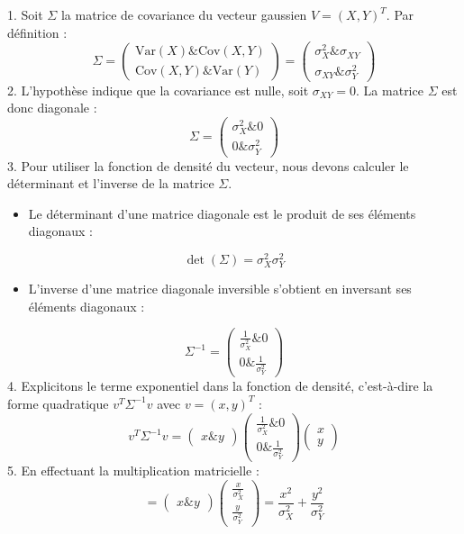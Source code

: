 \documentclass[11pt,a4paper]{article}
\begin{document}
1. Soit $\Sigma$ la matrice de covariance du vecteur gaussien $V = (X, Y)^T$. Par définition :
   $$ \Sigma = \begin{pmatrix} \text{Var}(X) \& \text{Cov}(X,Y) \\ \text{Cov}(X,Y) \& \text{Var}(Y) \end{pmatrix} = \begin{pmatrix} \sigma_X^2 \& \sigma_{XY} \\ \sigma_{XY} \& \sigma_Y^2 \end{pmatrix} $$
2. L'hypothèse indique que la covariance est nulle, soit $\sigma_{XY} = 0$. La matrice $\Sigma$ est donc diagonale :
   $$ \Sigma = \begin{pmatrix} \sigma_X^2 \& 0 \\ 0 \& \sigma_Y^2 \end{pmatrix} $$
3. Pour utiliser la fonction de densité du vecteur, nous devons calculer le déterminant et l'inverse de la matrice $\Sigma$.
\begin{itemize}
\item Le déterminant d'une matrice diagonale est le produit de ses éléments diagonaux :
\end{itemize}     $$ \det(\Sigma) = \sigma_X^2 \sigma_Y^2 $$
\begin{itemize}
\item L'inverse d'une matrice diagonale inversible s'obtient en inversant ses éléments diagonaux :
\end{itemize}     $$ \Sigma^{-1} = \begin{pmatrix} \frac{1}{\sigma_X^2} \& 0 \\ 0 \& \frac{1}{\sigma_Y^2} \end{pmatrix} $$
4. Explicitons le terme exponentiel dans la fonction de densité, c'est-à-dire la forme quadratique $v^T \Sigma^{-1} v$ avec $v = (x, y)^T$ :
   $$ v^T \Sigma^{-1} v = \begin{pmatrix} x \& y \end{pmatrix} \begin{pmatrix} \frac{1}{\sigma_X^2} \& 0 \\ 0 \& \frac{1}{\sigma_Y^2} \end{pmatrix} \begin{pmatrix} x \\ y \end{pmatrix} $$
5. En effectuant la multiplication matricielle :
   $$ = \begin{pmatrix} x \& y \end{pmatrix} \begin{pmatrix} \frac{x}{\sigma_X^2} \\ \frac{y}{\sigma_Y^2} \end{pmatrix} = \frac{x^2}{\sigma_X^2} + \frac{y^2}{\sigma_Y^2} $$
\end{document}
